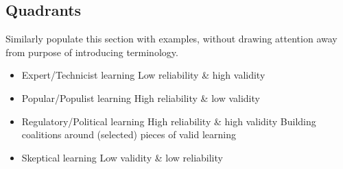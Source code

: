 
\subsection*{Quadrants}

Similarly populate this section with examples, without drawing attention away from purpose of introducing terminology.

\begin{itemize}
	\item Expert/Technicist learning
		\subitem Low reliability \& high validity
	\item Popular/Populist learning
		\subitem High reliability \& low validity
	\item Regulatory/Political learning
		\subitem High reliability \& high validity
		\subitem Building coalitions around (selected) pieces of valid learning
	\item Skeptical learning
		\subitem Low validity \& low reliability
\end{itemize}